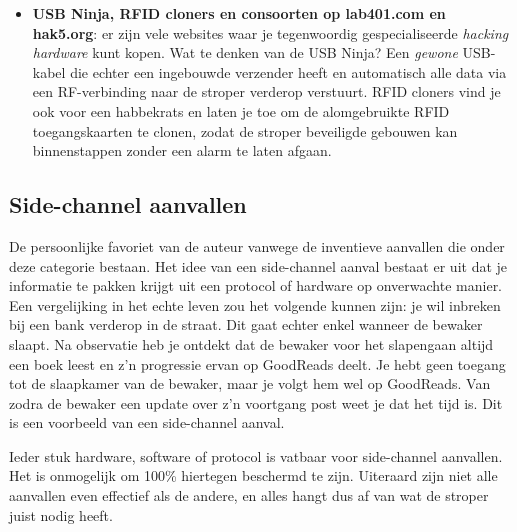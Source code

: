 \documentclass[
  10pt,
  dutch,
  paper=a4,
  ,captions=tableheading
]{scrbook}
\begin{document}
\begin{itemize}
  permanent toegang tot hebben. Enkele dagen of weken later moet de
  stroper dan enkel de keylogger ophalen. Gerelateerd hieraan is juice
  hacking, een fenomeen dat hier en daar opduikt. In publieke plaatsen
  zijn er meer en meer publieke oplaadpunten waar gebruikers hun
  digitale toestellen via een USB-draad kunnen opladen. Maar hoe zeker
  ben je eigenlijk dat die draad die in de muur verdwijnt niets meer is
  dan een \emph{oplaadkabel}? Wat als aan de andere kant van de muur de
  draad aan het toestel van de stroper hangt?
\item
  \textbf{USB Ninja, RFID cloners en consoorten op lab401.com en
  hak5.org}: er zijn vele websites waar je tegenwoordig gespecialiseerde
  \emph{hacking hardware} kunt kopen. Wat te denken van de USB Ninja?
  Een \emph{gewone} USB-kabel die echter een ingebouwde verzender heeft
  en automatisch alle data via een RF-verbinding naar de stroper
  verderop verstuurt. RFID cloners vind je ook voor een habbekrats en
  laten je toe om de alomgebruikte RFID toegangskaarten te clonen, zodat
  de stroper beveiligde gebouwen kan binnenstappen zonder een alarm te
  laten afgaan.
\end{itemize}

\subsection{Side-channel aanvallen}\label{side-channel-aanvallen}

De persoonlijke favoriet van de auteur vanwege de inventieve aanvallen
die onder deze categorie bestaan. Het idee van een side-channel aanval
bestaat er uit dat je informatie te pakken krijgt uit een protocol of
hardware op onverwachte manier. Een vergelijking in het echte leven zou
het volgende kunnen zijn: je wil inbreken bij een bank verderop in de
straat. Dit gaat echter enkel wanneer de bewaker slaapt. Na observatie
heb je ontdekt dat de bewaker voor het slapengaan altijd een boek leest
en z'n progressie ervan op GoodReads deelt. Je hebt geen toegang tot de
slaapkamer van de bewaker, maar je volgt hem wel op GoodReads. Van zodra
de bewaker een update over z'n voortgang post weet je dat het tijd is.
Dit is een voorbeeld van een side-channel aanval.

Ieder stuk hardware, software of protocol is vatbaar voor side-channel
aanvallen. Het is onmogelijk om 100\% hiertegen beschermd te zijn.
Uiteraard zijn niet alle aanvallen even effectief als de andere, en
alles hangt dus af van wat de stroper juist nodig heeft.
\end{document}
